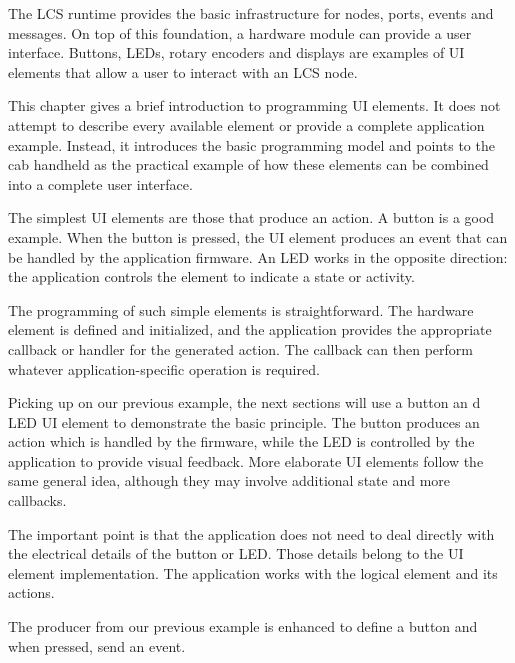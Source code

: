 

The LCS runtime provides the basic infrastructure for nodes, ports, events and messages. On top of this foundation, a hardware module can provide a user interface. Buttons, LEDs, rotary encoders and displays are examples of UI elements that allow a user to interact with an LCS node.

This chapter gives a brief introduction to programming UI elements. It does not attempt to describe every available element or provide a complete application example. Instead, it introduces the basic programming model and points to the cab handheld as the practical example of how these elements can be combined into a complete user interface.


The simplest UI elements are those that produce an action. A button is a good example. When the button is pressed, the UI element produces an event that can be handled by the application firmware. An LED works in the opposite direction: the application controls the element to indicate a state or activity.

The programming of such simple elements is straightforward. The hardware element is defined and initialized, and the application provides the appropriate callback or handler for the generated action. The callback can then perform whatever application-specific operation is required.

Picking up on our previous example, the next sections will use a button an d LED UI element to demonstrate the basic principle. The button produces an action which is handled by the firmware, while the LED is controlled by the application to provide visual feedback. More elaborate UI elements follow the same general idea, although they may involve additional state and more callbacks.

The important point is that the application does not need to deal directly with the electrical details of the button or LED. Those details belong to the UI element implementation. The application works with the logical element and its actions.


The producer from our previous example is enhanced to define a button and when pressed, send an event. 

